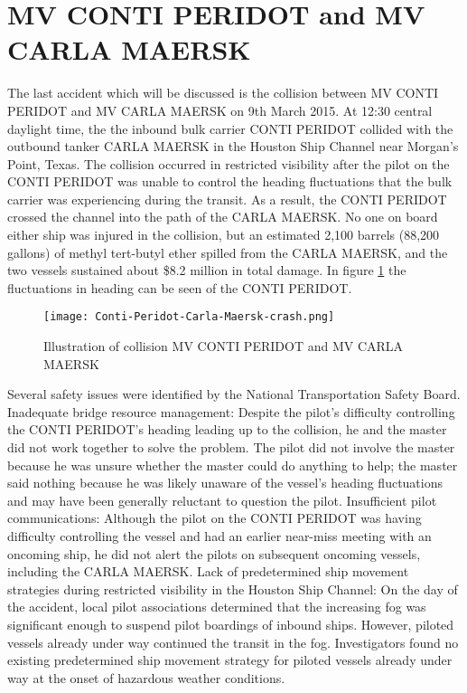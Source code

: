 \newpage
\section{MV CONTI PERIDOT and MV CARLA MAERSK}
The last accident which will be discussed is the collision between MV CONTI PERIDOT and MV CARLA MAERSK on 9th March 2015. At 12:30 central daylight time, the the inbound bulk carrier CONTI PERIDOT collided with the outbound tanker CARLA MAERSK in the Houston Ship Channel near Morgan’s Point, Texas. The collision occurred in restricted visibility after the pilot on the CONTI PERIDOT was unable to control the heading fluctuations that the bulk carrier was experiencing during the transit. As a result, the CONTI PERIDOT crossed the channel into the path of the CARLA MAERSK. No one on board either ship was injured in the collision, but an estimated 2,100 barrels (88,200 gallons) of methyl tert-butyl ether spilled from the CARLA MAERSK, and the two vessels sustained about \$8.2 million in total damage. In figure \ref{fig:Conti-Peridot-Carla-Maersk-crash} the fluctuations in heading can be seen of the CONTI PERIDOT. 

\begin{figure}[p]
	\centering
	\texttt{[image: Conti-Peridot-Carla-Maersk-crash.png]}
	\caption{Illustration of collision MV CONTI PERIDOT and MV CARLA MAERSK}
	\label{fig:Conti-Peridot-Carla-Maersk-crash}
\end{figure}

Several safety issues were identified by the National Transportation Safety Board. Inadequate bridge resource management: Despite the pilot’s difficulty controlling the CONTI PERIDOT’s heading leading up to the collision, he and the master did not work together to solve the problem. The pilot did not involve the master because he was unsure whether the master could do anything to help; the master said nothing because he was likely unaware of the vessel’s heading fluctuations and may have been generally reluctant to question the pilot.
Insufficient pilot communications: Although the pilot on the CONTI PERIDOT was having difficulty controlling the vessel and had an earlier near-miss meeting with an oncoming ship, he did not alert the pilots on subsequent oncoming vessels, including the CARLA MAERSK.
Lack of predetermined ship movement strategies during restricted visibility in the Houston Ship Channel: On the day of the accident, local pilot associations  determined that the increasing fog was significant enough to suspend pilot boardings of inbound ships. However, piloted vessels already under way continued the transit in the fog. Investigators found no existing predetermined ship movement strategy for piloted vessels already under way at the onset of hazardous weather conditions.


